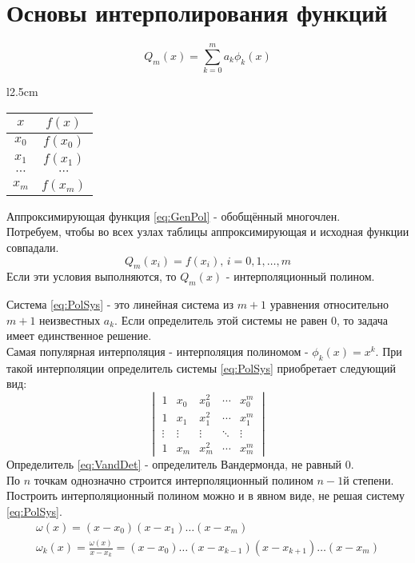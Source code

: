\documentclass[a4paper,11pt]{article}
\begin{document}
\section{Основы интерполирования функций}
\begin{minipage}{1\linewidth}
  \begin{equation}
    Q_m(x) = \sum_{k=0}^{m} a_k \phi_k(x)
    \label{eq:GenPol}
  \end{equation}
  \begin{wraptable}{l}{2.5cm}
    \begin{tabular}{ c|c }
      $x$ & $f(x)$ \\
      \hline
      $x_0$ & $f(x_0)$ \\
      $x_1$ & $f(x_1)$ \\
      $\cdots$ & $\cdots$ \\
      $x_m$ & $f(x_m)$
    \end{tabular}
  \end{wraptable}

  Аппроксимирующая функция \ref{eq:GenPol} - обобщённый многочлен. \\
  Потребуем, чтобы во всех узлах таблицы аппроксимирующая и исходная функции совпадали.
  \begin{equation}
    Q_m(x_i) = f(x_i), \, i = 0, 1, \dots, m
    \label{eq:PolSys}
  \end{equation}
  Если эти условия выполняются, то $Q_m(x)$ - интерполяционный полином.  
\vspace{2mm}
\end{minipage}
\newline
Система \ref{eq:PolSys} - это линейная система из $m+1$ уравнения относительно $m+1$ неизвестных $a_k$. Если определитель этой системы не равен $0$, то задача имеет единственное решение. \\
Самая популярная интерполяция - интерполяция полиномом - \(\phi_k(x) = x^k\).
При такой интерполяции определитель системы \ref{eq:PolSys} приобретает следующий вид:
\begin{equation}
  \begin{vmatrix}
    1 & x_0 & x_0^2 & \cdots & x_0^m \\
    1 & x_1 & x_1^2 & \cdots & x_1^m \\
    \vdots & \vdots & \vdots & \ddots & \vdots \\
    1 & x_m & x_m^2 & \cdots & x_m^m
  \end{vmatrix}
  \label{eq:VandDet}
\end{equation}
Определитель \ref{eq:VandDet} - определитель Вандермонда, не равный $0$. \\
По $n$ точкам однозначно строится интерполяционный полином $n-1$й степени. \\
Построить интерполяционный полином можно и в явном виде, не решая систему \ref{eq:PolSys}.
\begin{gather*}
  \omega(x) = (x - x_0)(x - x_1)\dots(x - x_m) \\
  \omega_k(x) = \frac{\omega(x)}{x - x_k} = (x - x_0)\dots(x - x_{k-1})(x - x_{k+1})\dots(x - x_m)
\end{gather*}
\end{document}

